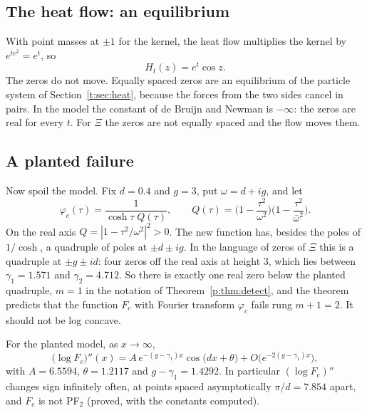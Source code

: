 \subsection{The heat flow: an equilibrium}

With point masses at $\pm1$ for the kernel, the heat flow multiplies the kernel by $e^{tv^2}=e^t$, so
\[
H_t(z)=e^t\cos z .
\]
The zeros do not move. Equally spaced zeros are an equilibrium of the particle system of Section~\ref{t:sec:heat}, because the forces from the two sides cancel in pairs. In the model the constant of de Bruijn and Newman is $-\infty$: the zeros are real for every $t$. For $\Xi$ the zeros are not equally spaced and the flow moves them.

\subsection{A planted failure}\label{e:sec:toy}

Now spoil the model. Fix $d=0.4$ and $g=3$, put $\omega=d+ig$, and let
\[
\varphi_c(\tau)=\frac{1}{\cosh\tau\;Q(\tau)},\qquad Q(\tau)=\Big(1-\frac{\tau^2}{\omega^2}\Big)\Big(1-\frac{\tau^2}{\bar\omega^2}\Big).
\]
On the real axis $Q=|1-\tau^2/\omega^2|^2>0$. The new function has, besides the poles of $1/\cosh$, a quadruple of poles at $\pm d\pm ig$. In the language of zeros of $\Xi$ this is a quadruple at $\pm g\pm id$: four zeros off the real axis at height $3$, which lies between $\gamma_1=1.571$ and $\gamma_2=4.712$. So there is exactly one real zero below the planted quadruple, $m=1$ in the notation of Theorem~\ref{p:thm:detect}, and the theorem predicts that the function $F_c$ with Fourier transform $\varphi_c$ fails rung $m+1=2$. It should not be log concave.

\begin{proposition}\label{e:prop:toy}
For the planted model, as $x\to\infty$,
\[
\big(\log F_c\big)''(x)=A\,e^{-(g-\gamma_1)x}\cos\big(dx+\theta\big)+O\big(e^{-2(g-\gamma_1)x}\big),
\]
with $A=6.5594$, $\theta=1.2117$ and $g-\gamma_1=1.4292$. In particular $(\log F_c)''$ changes sign infinitely often, at points spaced asymptotically $\pi/d=7.854$ apart, and $F_c$ is not PF$_2$ (proved, with the constants computed).
\end{proposition}

